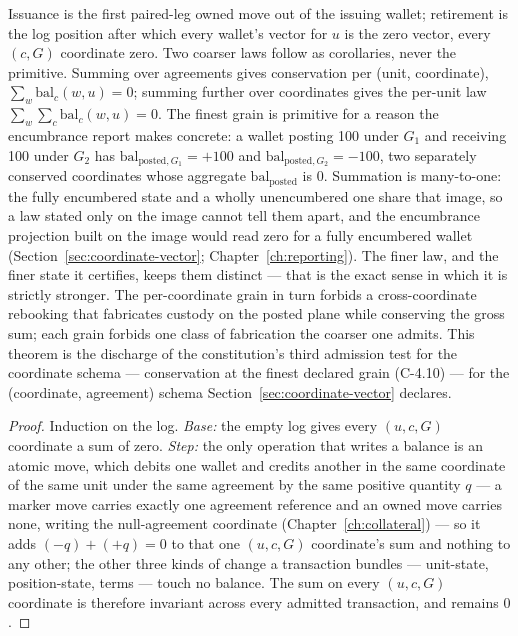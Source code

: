 \documentclass[11pt,a4paper]{article}
\begin{document}
Issuance is the first paired-leg owned move out of the issuing wallet; retirement is the
log position after which every wallet's vector for $u$ is the zero vector, every $(c,G)$
coordinate zero. Two coarser laws follow as corollaries, never the primitive. Summing over
agreements gives conservation per (unit, coordinate), $\sum_w \mathrm{bal}_c(w,u)=0$;
summing further over coordinates gives the per-unit law $\sum_w\sum_c \mathrm{bal}_c(w,u)=0$.
The finest grain is primitive for a reason the encumbrance report makes concrete: a wallet
posting 100 under $G_1$ and receiving 100 under $G_2$ has
$\mathrm{bal}_{\text{posted},G_1}=+100$ and $\mathrm{bal}_{\text{posted},G_2}=-100$, two
separately conserved coordinates whose aggregate $\mathrm{bal}_{\text{posted}}$ is $0$.
Summation is many-to-one: the fully encumbered state and a wholly unencumbered one share
that image, so a law stated only on the image cannot tell them apart, and the encumbrance
projection built on the image would read zero for a fully encumbered wallet
(Section~\ref{sec:coordinate-vector}; Chapter~\ref{ch:reporting}). The finer law,
and the finer state it certifies, keeps them distinct --- that is the exact sense in which
it is strictly stronger. The per-coordinate grain in turn forbids a cross-coordinate
rebooking that fabricates custody on the posted plane while conserving the gross sum; each
grain forbids one class of fabrication the coarser one admits. This theorem is the
discharge of the constitution's third admission test for the coordinate schema ---
conservation at the finest declared grain (C-4.10) --- for the (coordinate, agreement)
schema Section~\ref{sec:coordinate-vector} declares.

\begin{proof}
Induction on the log. \emph{Base:} the empty log gives every $(u,c,G)$ coordinate a sum of
zero. \emph{Step:} the only operation that writes a balance is an atomic move, which debits
one wallet and credits another in the same coordinate of the same unit under the same
agreement by the same positive quantity $q$ --- a marker move carries exactly one agreement
reference and an owned move carries none, writing the null-agreement coordinate
(Chapter~\ref{ch:collateral}) --- so it adds $(-q)+(+q)=0$ to that one $(u,c,G)$ coordinate's
sum and nothing to any other; the other three kinds of change a transaction bundles ---
unit-state, position-state, terms --- touch no balance. The sum on every $(u,c,G)$
coordinate is therefore invariant across every admitted transaction, and remains $0$.
\end{proof}
\end{document}

